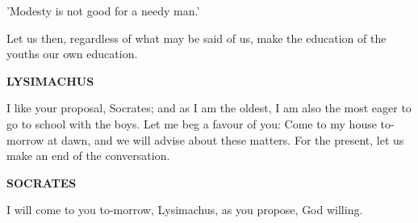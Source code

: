 \documentclass[11pt,letter]{article}
\begin{document}
\par  'Modesty is not good for a needy man.'

\par  Let us then, regardless of what may be said of us, make the education of the youths our own education.

\par \textbf{LYSIMACHUS}
\par   I like your proposal, Socrates; and as I am the oldest, I am also the most eager to go to school with the boys. Let me beg a favour of you:  Come to my house to-morrow at dawn, and we will advise about these matters. For the present, let us make an end of the conversation.

\par \textbf{SOCRATES}
\par   I will come to you to-morrow, Lysimachus, as you propose, God willing.

\par 
 
\end{document}
